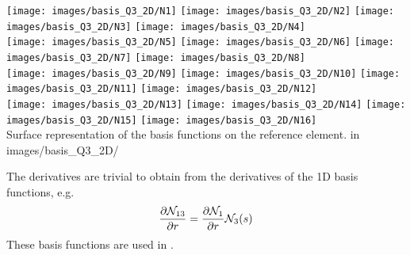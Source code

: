 \begin{center}
\texttt{[image: images/basis\_Q3\_2D/N1]}
\texttt{[image: images/basis\_Q3\_2D/N2]}
\texttt{[image: images/basis\_Q3\_2D/N3]}
\texttt{[image: images/basis\_Q3\_2D/N4]}\\
\texttt{[image: images/basis\_Q3\_2D/N5]}
\texttt{[image: images/basis\_Q3\_2D/N6]}
\texttt{[image: images/basis\_Q3\_2D/N7]}
\texttt{[image: images/basis\_Q3\_2D/N8]}\\
\texttt{[image: images/basis\_Q3\_2D/N9]}
\texttt{[image: images/basis\_Q3\_2D/N10]}
\texttt{[image: images/basis\_Q3\_2D/N11]}
\texttt{[image: images/basis\_Q3\_2D/N12]}\\
\texttt{[image: images/basis\_Q3\_2D/N13]}
\texttt{[image: images/basis\_Q3\_2D/N14]}
\texttt{[image: images/basis\_Q3\_2D/N15]}
\texttt{[image: images/basis\_Q3\_2D/N16]}\\
{\captionfont Surface representation of the basis functions on the reference element.
{\color{gray} in images/basis\_Q3\_2D/ }}
\end{center}
The derivatives are trivial to obtain from the derivatives of the 1D basis functions, 
e.g.
\[
\frac{\partial {\mathcal{N}}_{13}}{\partial r} = 
\frac{\partial {\mathcal{N}}_{1}}{\partial r} {\mathcal{N}}_3(s) 
\]
These basis functions are used in .
